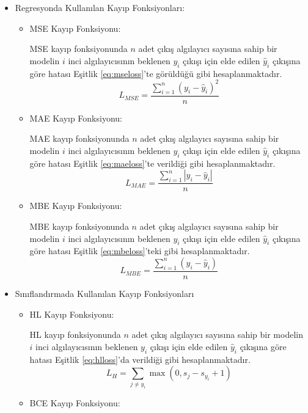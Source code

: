 \begin{itemize}
	\item Regresyonda Kullanılan Kayıp Fonksiyonları:
        \begin{itemize}
        	\item MSE Kayıp Fonksiyonu: 
        	
        	MSE kayıp fonksiyonunda $n$ adet çıkış algılayıcı sayısına sahip bir modelin $i$ inci algılayıcısının beklenen $y_{i}$ çıkışı için elde edilen $\hat{y}_{i}$ çıkışına göre hatası Eşitlik \ref{eq:mseloss}'te görüldüğü gibi hesaplanmaktadır.
        	{\setlength{\mathindent}{-1cm}
        	\begin{equation}
        		\label{eq:mseloss}
        		L_{MSE}=\frac{\sum_{i=1}^{n}\left(y_{i}-\hat{y}_{i}\right)^{2}}{n}
        	\end{equation}}
        	\item MAE Kayıp Fonksiyonu: 
        	
        	MAE kayıp fonksiyonunda $n$ adet çıkış algılayıcı sayısına sahip bir modelin $i$ inci algılayıcısının beklenen $y_{i}$ çıkışı için elde edilen $\hat{y}_{i}$ çıkışına göre hatası Eşitlik \ref{eq:maeloss}'te verildiği gibi hesaplanmaktadır.
        	{\setlength{\mathindent}{-1cm}
        	\begin{equation}
        		\label{eq:maeloss}
        		L_{MAE}=\frac{\sum_{i=1}^{n}\left|y_{i}-\hat{y}_{i}\right|}{n}
        	\end{equation}}
        	\item MBE Kayıp Fonksiyonu: 
        	
        	MBE kayıp fonksiyonunda $n$ adet çıkış algılayıcı sayısına sahip bir modelin $i$ inci algılayıcısının beklenen $y_{i}$ çıkışı için elde edilen $\hat{y}_{i}$ çıkışına göre hatası Eşitlik \ref{eq:mbeloss}'teki gibi hesaplanmaktadır.
        	{\setlength{\mathindent}{-1cm}
        	\begin{equation}
        		\label{eq:mbeloss}
        		L_{MBE}=\frac{\sum_{i=1}^{n}\left(y_{i}-\hat{y}_{i}\right)}{n}
        	\end{equation}}
        \end{itemize}

    \item  Sınıflandırmada Kullanılan Kayıp Fonksiyonları
    \begin{itemize}
    	\item HL Kayıp Fonksiyonu: 
    	
    	HL kayıp fonksiyonunda $n$ adet çıkış algılayıcı sayısına sahip bir modelin $i$ inci algılayıcısının beklenen $y_{i}$ çıkışı için elde edilen $\hat{y}_{i}$ çıkışına göre hatası Eşitlik \ref{eq:hlloss}'da verildiği gibi hesaplanmaktadır.
    	{\setlength{\mathindent}{-1cm}
    	\begin{equation}
    		\label{eq:hlloss}
    		L_{H}=\sum_{j \neq y_{i}} \max \left(0, s_{j}-s_{y_{i}}+1\right)
    	\end{equation}}
    	\item BCE Kayıp Fonksiyonu: 
    	

\end{itemize}
\end{itemize}
